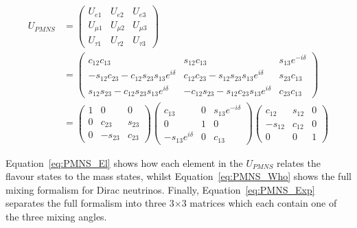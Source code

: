 \begin{align}
  U_{PMNS} &= \begin{pmatrix} U_{e1} & U_{e2} & U_{e3} \\ U_{\mu1} & U_{\mu2} & U_{\mu3} \\ U_{\tau1} & U_{\tau2} & U_{\tau3} \end{pmatrix} \label{eq:PMNS_El} \\
  &= \begin{pmatrix} c_{12}c_{13}                                  & s_{12}c_{13}                                  & s_{13}e^{-i\delta} \\
                     -s_{12}c_{23} - c_{12}s_{23}s_{13}e^{i\delta} & c_{12}c_{23} - s_{12}s_{23}s_{13}e^{i\delta}  & s_{23}c_{13}      \\
                     s_{12}s_{23} - c_{12}s_{23}s_{13}e^{i\delta}  & -c_{12}s_{23} - s_{12}c_{23}s_{13}e^{i\delta} & c_{23}c_{13}      \end{pmatrix} \label{eq:PMNS_Who}  \\
  &= \begin{pmatrix} 1 & 0 & 0                       \\ 0 & c_{23} & s_{23}  \\ 0 & -s_{23} & c_{23}            \end{pmatrix}
     \begin{pmatrix} c_{13} & 0 & s_{13}e^{-i\delta} \\ 0 & 1 & 0            \\ -s_{13}e^{i\delta} & 0 & c_{13} \end{pmatrix}
     \begin{pmatrix} c_{12} & s_{12} & 0             \\ -s_{12} & c_{12} & 0 \\ 0 & 0 & 1                       \end{pmatrix} \label{eq:PMNS_Exp}
\end{align}

Equation~\ref{eq:PMNS_El} shows how each element in the $U_{PMNS}$ relates the flavour states to the mass states, whilst Equation~\ref{eq:PMNS_Who} shows the full mixing formalism for Dirac neutrinos. Finally, Equation~\ref{eq:PMNS_Exp} separates the full formalism into three 3$\times$3 matrices which each contain one of the three mixing angles. \\

